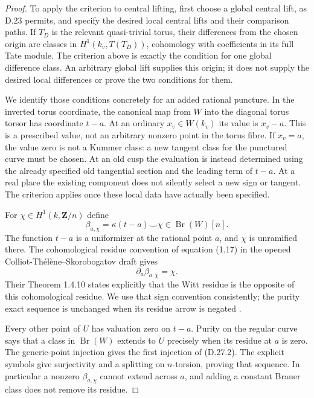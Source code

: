 \begin{proof}
To apply the criterion to central lifting, first choose a
global central lift, as D.23 permits, and specify the desired
local central lifts and their comparison paths. If $T_D$ is
the relevant quasi-trivial torus, their differences from the
chosen origin are classes in $H^1(k_v,T(T_D))$, cohomology
with coefficients in its full Tate module. The criterion above
is exactly the condition for one global difference class.
An arbitrary global lift supplies this origin; it does not
supply the desired local differences or prove the two
conditions for them.

We identify those conditions concretely for an added
rational puncture. In the inverted torus coordinate, the
canonical map from $W$ into the diagonal torus torsor has
coordinate $t-a$. At an ordinary $x_v\in W(k_v)$ its value
is $x_v-a$. This is a prescribed value, not an arbitrary
nonzero point in the torus fibre. If $x_v=a$, the value zero
is not a Kummer class: a new tangent class for the punctured
curve must be chosen. At an old cusp the evaluation is
instead determined using the already specified old
tangential section and the leading term of $t-a$. At a
real place the existing component does not silently select
a new sign or tangent. The criterion applies once these
local data have actually been specified.

For $\chi\in H^1(k,\mathbf Z/n)$ define
\[
 \beta_{a,\chi}=\kappa(t-a)\smile\chi
                  \in\operatorname{Br}(W)[n].
\]
The function $t-a$ is a uniformizer at the rational point
$a$, and $\chi$ is unramified there. The cohomological
residue convention of equation (1.17) in the opened
Colliot-Th\'el\`ene--Skorobogatov draft gives
\[
                  \partial_a\beta_{a,\chi}=\chi.
\]
Their Theorem 1.4.10 states explicitly that the Witt residue
is the opposite of this cohomological residue. We use that
sign convention consistently; the purity exact sequence is
unchanged when its residue arrow is negated
\cite[\S1.4.1, equation (1.17), Theorem 1.4.10,
Proposition 3.6.1]{D_ColliotTheleneSkorobogatov2019}.

Every other point of $U$ has valuation zero on $t-a$.
Purity on the regular curve says that a class in
$\operatorname{Br}(W)$ extends to $U$ precisely when its
residue at $a$ is zero. The generic-point injection gives
the first injection of (D.27.2). The explicit symbols give
surjectivity and a splitting on $n$-torsion, proving that
sequence. In particular a nonzero $\beta_{a,\chi}$ cannot
extend across $a$, and adding a constant Brauer class does
not remove its residue.


\end{proof}
